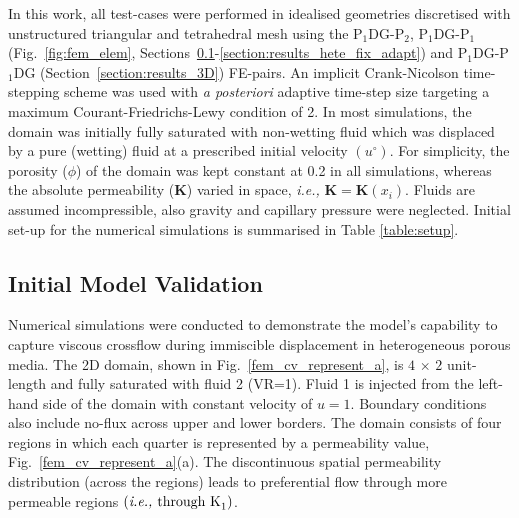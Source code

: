 \documentclass[preprint,authoryear,12pt]{elsarticle}
\newcommand{\PN}[2][error]{P$_{#1}$DG-P$_{#2}$}
\newcommand{\PNDG}[2][error]{P$_{#1}$DG-P$_{#2}$DG}
\newcommand{\ie}{{\it i.e., }}
\begin{document}
In this work, all test-cases were performed in idealised geometries discretised with unstructured triangular and tetrahedral mesh using the \PN[1]{2}, \PN[1]{1} (Fig.~\ref{fig:fem_elem}, Sections~\ref{section:results_initial_model_validation}-\ref{section:results_hete_fix_adapt}) and \PNDG[1]{1} (Section~\ref{section:results_3D})  FE-pairs. An implicit Crank-Nicolson time-stepping scheme was used with {\it a posteriori} adaptive time-step size targeting a maximum Courant-Friedrichs-Lewy condition \citep[CFL,][]{courant_1941} of 2. In most simulations, the domain was initially fully saturated with non-wetting fluid which was displaced by a pure (wetting) fluid at a prescribed initial velocity $\left(u^{\circ}\right)$. For simplicity, the porosity ($\phi$) of the domain was kept constant at 0.2 in all simulations, whereas the absolute permeability ($\mathbf{K}$) varied in space, \ie $\mathbf{K}=\mathbf{K}\left(x_{i}\right)$. Fluids are assumed incompressible, also gravity and capillary pressure were neglected. Initial set-up for the numerical simulations is summarised in Table \ref{table:setup}. 
 
\subsection{Initial Model Validation}\label{section:results_initial_model_validation}
Numerical simulations \citep[based on lab experiments due to][]{evans_1994,dawe_2008} were conducted to demonstrate the model's capability to capture viscous crossflow during immiscible displacement in heterogeneous porous media. The 2D domain, shown in Fig.~\ref{fem_cv_represent_a}, is $4$ $\times$ $2$ unit-length and fully saturated with fluid 2 (VR=1). Fluid 1 is injected from the left-hand side of the domain with constant velocity of $u=1$. Boundary conditions also include no-flux across upper and lower borders. The domain consists of four regions in which each quarter is represented by a permeability value, Fig.~\ref{fem_cv_represent_a}(a). The discontinuous spatial permeability distribution (across the regions) leads to preferential flow through more permeable regions $\left(\text{\ie through K}_{1}\right)$. %
\end{document}
